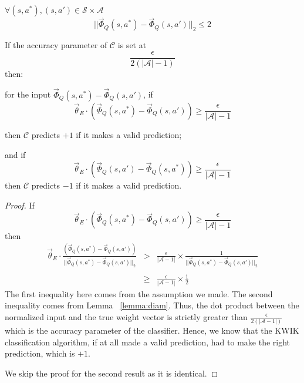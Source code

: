 \begin{lemma}
\label{lemma:diam}
$\forall (s,a^*), (s,a') \in \mathcal{S} \times \mathcal{A}$
\begin{equation}
||\vec{\Phi}_Q(s,a^*) - \vec{\Phi}_Q(s,a') ||_2 \leq 2
\end{equation}
\end{lemma} 
 
 

\begin{thm}
\label{thm:kwik_converse}
If the accuracy parameter of $\mathcal{C}$ is set at
\[
\frac{\epsilon}{2(|\mathcal{A}|-1)}
\]
then:

 for the input $\vec{\Phi}_Q(s,a^*) - \vec{\Phi}_Q(s,a')$, if
\begin{equation}
\vec{\theta}_E \cdot (\vec{\Phi}_Q(s,a^*) - \vec{\Phi}_Q(s,a')) \geq  \frac{\epsilon}{|\mathcal{A}|-1}
\end{equation}

then $\mathcal{C}$ predicts $+1$ if it makes a valid prediction;

and if
\begin{equation}
\vec{\theta}_E \cdot (\vec{\Phi}_Q(s,a') - \vec{\Phi}_Q(s,a^*)) \geq  \frac{\epsilon}{|\mathcal{A}|-1}
\end{equation}
then $\mathcal{C}$ predicts $-1$ if it makes a valid prediction.

\end{thm} 
 
 
\begin{proof}
If 
\begin{equation}
\vec{\theta}_E \cdot (\vec{\Phi}_Q(s,a^*) - \vec{\Phi}_Q(s,a')) \geq  \frac{\epsilon}{|\mathcal{A}|-1}
\end{equation}
then
\[
\begin{array}{rcl}
{\vec{\theta}_E \cdot \displaystyle \frac{(\vec{\Phi}_Q(s,a^*) - \vec{\Phi}_Q(s,a'))}{||\vec{\Phi}_Q(s,a^*) - \vec{\Phi}_Q(s,a')||_2 } } & 
>& \displaystyle \frac{\epsilon}{|\mathcal{A}-1|} \times \frac{1}{||\vec{\Phi}_Q(s,a^*) - \vec{\Phi}_Q(s,a')||_2} \\
&&\\
&\geq& \displaystyle\frac{\epsilon}{|\mathcal{A}-1|}  \times \frac{1}{2}
\end{array}
\]
The first inequality here comes from the assumption we made. The second inequality comes from Lemma ~\ref{lemma:diam}. Thus, the dot product between the normalized input and the true weight vector is strictly greater than $\frac{\epsilon}{2(|\mathcal{A}-1|)}$ which is the accuracy parameter of the classifier. Hence, we know that the KWIK classification algorithm, if at all made a valid prediction, had to make the right prediction, which is $+1$.

We skip the proof for the second result as it is identical.
\end{proof} 
 
